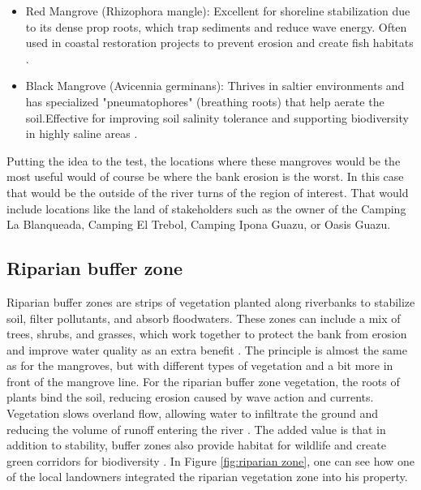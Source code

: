 \begin{itemize}
    \item Red Mangrove (Rhizophora mangle): Excellent for shoreline stabilization due to its dense prop roots, which trap sediments and reduce wave energy. Often used in coastal restoration projects to prevent erosion and create fish habitats \autocite{sprungHowLongDoes2021}.
    \item Black Mangrove (Avicennia germinans): Thrives in saltier environments and has specialized "pneumatophores" (breathing roots) that help aerate the soil.Effective for improving soil salinity tolerance and supporting biodiversity in highly saline areas \autocite{hammondWhatBlackMangrove2022}.
\end{itemize}

Putting the idea to the test, the locations where these mangroves would be the most useful would of course be where the bank erosion is the worst. In this case that would be the outside of the river turns of the region of interest. That would include locations like the land of stakeholders such as the owner of the Camping La Blanqueada, Camping El Trebol, Camping Ipona Guazu, or Oasis Guazu.

\subsection{Riparian buffer zone}
Riparian buffer zones are strips of vegetation planted along riverbanks to stabilize soil, filter pollutants, and absorb floodwaters. These zones can include a mix of trees, shrubs, and grasses, which work together to protect the bank from erosion and improve water quality as an extra benefit \autocite{ukforestrystandardCreatingManagingRiparian2024}. The principle is almost the same as for the mangroves, but with different types of vegetation and a bit more in front of the mangrove line. For the riparian buffer zone vegetation, the roots of plants bind the soil, reducing erosion caused by wave action and currents. Vegetation slows overland flow, allowing water to infiltrate the ground and reducing the volume of runoff entering the river \autocite{marshallUnderstandingVitalRole2024}. The added value is that in addition to stability, buffer zones also provide habitat for wildlife and create green corridors for biodiversity \autocite{vagheeiFreshwaterRiparianZones2025}. In Figure \ref{fig:riparian zone}, one can see how one of the local landowners integrated the riparian vegetation zone into his property.

